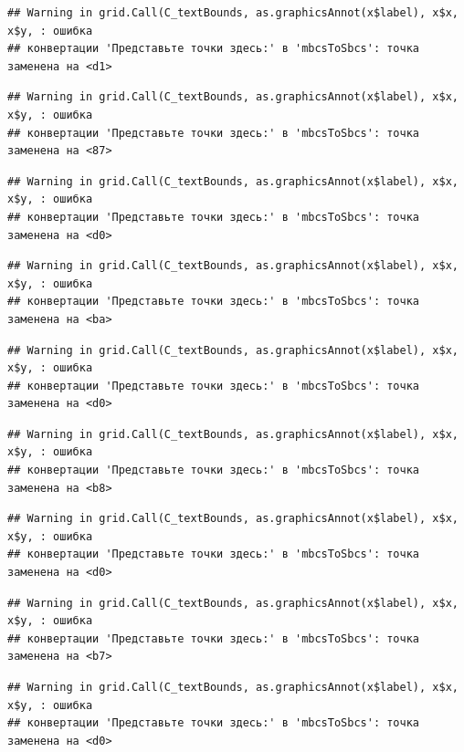 \documentclass[]{book}
\begin{document}
\begin{verbatim}
## Warning in grid.Call(C_textBounds, as.graphicsAnnot(x$label), x$x, x$y, : ошибка
## конвертации 'Представьте точки здесь:' в 'mbcsToSbcs': точка заменена на <d1>
\end{verbatim}

\begin{verbatim}
## Warning in grid.Call(C_textBounds, as.graphicsAnnot(x$label), x$x, x$y, : ошибка
## конвертации 'Представьте точки здесь:' в 'mbcsToSbcs': точка заменена на <87>
\end{verbatim}

\begin{verbatim}
## Warning in grid.Call(C_textBounds, as.graphicsAnnot(x$label), x$x, x$y, : ошибка
## конвертации 'Представьте точки здесь:' в 'mbcsToSbcs': точка заменена на <d0>
\end{verbatim}

\begin{verbatim}
## Warning in grid.Call(C_textBounds, as.graphicsAnnot(x$label), x$x, x$y, : ошибка
## конвертации 'Представьте точки здесь:' в 'mbcsToSbcs': точка заменена на <ba>
\end{verbatim}

\begin{verbatim}
## Warning in grid.Call(C_textBounds, as.graphicsAnnot(x$label), x$x, x$y, : ошибка
## конвертации 'Представьте точки здесь:' в 'mbcsToSbcs': точка заменена на <d0>
\end{verbatim}

\begin{verbatim}
## Warning in grid.Call(C_textBounds, as.graphicsAnnot(x$label), x$x, x$y, : ошибка
## конвертации 'Представьте точки здесь:' в 'mbcsToSbcs': точка заменена на <b8>
\end{verbatim}

\begin{verbatim}
## Warning in grid.Call(C_textBounds, as.graphicsAnnot(x$label), x$x, x$y, : ошибка
## конвертации 'Представьте точки здесь:' в 'mbcsToSbcs': точка заменена на <d0>
\end{verbatim}

\begin{verbatim}
## Warning in grid.Call(C_textBounds, as.graphicsAnnot(x$label), x$x, x$y, : ошибка
## конвертации 'Представьте точки здесь:' в 'mbcsToSbcs': точка заменена на <b7>
\end{verbatim}

\begin{verbatim}
## Warning in grid.Call(C_textBounds, as.graphicsAnnot(x$label), x$x, x$y, : ошибка
## конвертации 'Представьте точки здесь:' в 'mbcsToSbcs': точка заменена на <d0>
\end{verbatim}
\end{document}
